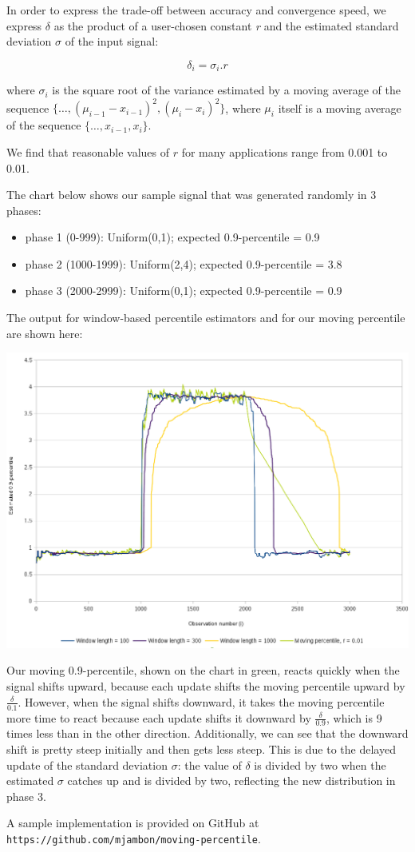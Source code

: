\documentclass[]{article}
\providecommand{\tightlist}{%
  \setlength{\itemsep}{0pt}\setlength{\parskip}{0pt}}
\begin{document}
In order to express the trade-off between accuracy and convergence
speed, we express \(\delta\) as the product of a user-chosen constant
\emph{r} and the estimated standard deviation \(\sigma\) of the input
signal:

\[ \delta_i = \sigma_i . r \]

where \(\sigma_i\) is the square root of the variance estimated by a
moving average of the sequence
$\{ \dots, (\mu_{i-1} - x_{i-1})^2, (\mu_i - x_i)^2 \}$, where
\(\mu_i\) itself is a moving average of the sequence
$\{ \dots, x_{i-1}, x_i \}$.

We find that reasonable values of \(r\) for many applications range from
0.001 to 0.01.

\clearpage

The chart below shows our sample signal that was generated randomly in 3
phases:

\begin{itemize}
\tightlist
\item
  phase 1 (0-999): Uniform(0,1); expected 0.9-percentile = 0.9
\item
  phase 2 (1000-1999): Uniform(2,4); expected 0.9-percentile = 3.8
\item
  phase 3 (2000-2999): Uniform(0,1); expected 0.9-percentile = 0.9
\end{itemize}

The output for window-based percentile estimators and for our moving
percentile are shown here:

\includegraphics[width=\textwidth]{img/moving-percentile-output}

Our moving 0.9-percentile, shown on the chart in green, reacts quickly
when the signal shifts upward, because each update shifts the moving
percentile upward by \(\frac{\delta}{0.1}\). However, when the signal
shifts downward, it takes the moving percentile more time to react
because each update shifts it downward by \(\frac{\delta}{0.9}\), which
is 9 times less than in the other direction. Additionally, we can see
that the downward shift is pretty steep initially and then gets less
steep. This is due to the delayed update of the standard deviation
\(\sigma\): the value of \(\delta\) is divided by two when the estimated
\(\sigma\) catches up and is divided by two, reflecting the new
distribution in phase 3.

A sample implementation is provided on GitHub at \\
\verb|https://github.com/mjambon/moving-percentile|.
\end{document}
